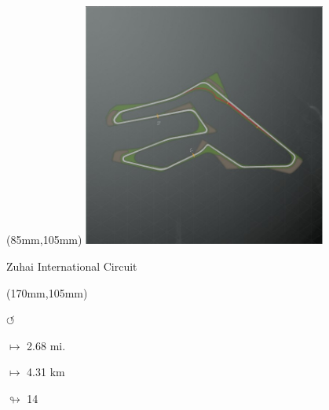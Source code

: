 \begin{textblock*}{80mm}(85mm,105mm)%
\includegraphics[width=80mm]{TR/2015-05-20_00070.png}
\centerline{Zuhai International Circuit}
\end{textblock*}
\begin{textblock*}{30mm}(170mm,105mm)%
\par \Huge$\circlearrowleft$
\Large
\par$\mapsto$ 2.68 mi.
\par$\mapsto$ 4.31 km
\par$\looparrowright$ 14
\end{textblock*}
